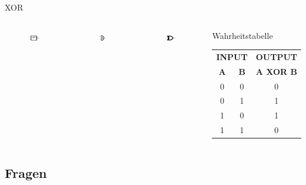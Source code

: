 \begin{frame}{XOR}
  \begin{columns}
    \begin{figure}
      \includegraphics[width=\textwidth,height=2em,keepaspectratio]{a14/XOR_IEC.pdf}
    \end{figure}
    \begin{figure}
      \includegraphics[width=\textwidth,height=2em,keepaspectratio]{a14/XOR_DIN.pdf}
    \end{figure}
    \begin{figure}
      \includegraphics[width=\textwidth,height=2em,keepaspectratio]{a14/XOR_ANSI.pdf}
    \end{figure}
    \begin{block}{Wahrheitstabelle}
      \begin{tabular}{cc|c}
        \multicolumn{2}{c|}{\textbf{INPUT}} & \textbf{OUTPUT} \\
        \textbf{A} & \textbf{B} & \textbf{A XOR B} \\ \hline
        0 & 0 & 0 \\
        0 & 1 & 1 \\
        1 & 0 & 1 \\
        1 & 1 & 0 \\
      \end{tabular}
    \end{block}
  \end{columns}
\end{frame}

\subsection{Fragen}

